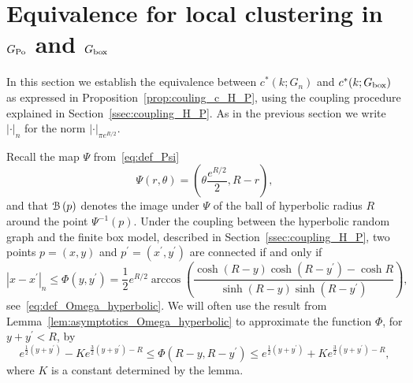 \section{Equivalence for local clustering in \texorpdfstring{$G_{{\mathrm{Po}}}$}{G Po} and \texorpdfstring{$G_{\mathrm{box}}$}{G box}}\label{sec:coupling_H_P_n}

In this section we establish the equivalence between $c^\ast(k; G_n)$ and $c^\ast(k; G_{\mathrm{box}})$ as expressed in Proposition~\ref{prop:couling_c_H_P}, using the coupling procedure explained in Section~\ref{ssec:coupling_H_P}. As in the previous section we write $|\cdot|_n$ for the norm $|\cdot|_{\pi e^{R/2}}$.

%
%

Recall the map $\Psi$ from~\eqref{eq:def_Psi}
\[
	\Psi(r,\theta) = \left(\theta \frac{e^{R/2}}{2}, R - r\right),
\] 
and that ${\mathcal B}\left(p\right)$ denotes the image under $\Psi$ of the ball of hyperbolic radius $R$ around the point $\Psi^{-1}(p)$. Under the coupling between the hyperbolic random graph and the finite box model, described in Section~\ref{ssec:coupling_H_P}, two points $p = (x,y)$ and $p^\prime = (x^\prime, y^\prime)$ are connected if and only if
\[
	|x-x^\prime|_n \le \Phi(y, y^\prime)
	= \frac{1}{2}e^{R/2} \arccos\left( \frac{\cosh(R-y) \cosh(R-y^\prime) - \cosh R}{\sinh(R-y) \sinh(R-y^\prime)} \right),
\]
see~\eqref{eq:def_Omega_hyperbolic}. We will often use the result from Lemma~\ref{lem:asymptotics_Omega_hyperbolic} to approximate the function $\Phi$, for $y + y^\prime < R$, by  
\[
	e^{\frac{1}{2}(y+y^\prime)} - K e^{\frac{3}{2}(y+y^\prime) - R} \leq \Phi(R - y, R - y^\prime) 
		\leq  e^{\frac{1}{2}(y+y^\prime)} + K e^{\frac{3}{2}(y+y^\prime) - R},
\]
where $K$ is a constant determined by the lemma.

